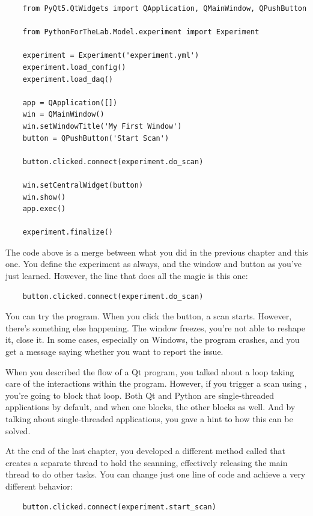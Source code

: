 \begin{verbatim}
    from PyQt5.QtWidgets import QApplication, QMainWindow, QPushButton

    from PythonForTheLab.Model.experiment import Experiment

    experiment = Experiment('experiment.yml')
    experiment.load_config()
    experiment.load_daq()

    app = QApplication([])
    win = QMainWindow()
    win.setWindowTitle('My First Window')
    button = QPushButton('Start Scan')

    button.clicked.connect(experiment.do_scan)

    win.setCentralWidget(button)
    win.show()
    app.exec()

    experiment.finalize()
\end{verbatim}

The code above is a merge between what you did in the previous chapter and this one. You define the experiment as always, and the window and button as you've just learned. However, the line that does all the magic is this one:

\begin{verbatim}
    button.clicked.connect(experiment.do_scan)
\end{verbatim}

You can try the program. When you click the button, a scan starts. However, there's something else happening. The window freezes, you're not able to reshape it, close it. In some cases, especially on Windows, the program crashes, and you get a message saying whether you want to report the issue.


When you described the flow of a Qt program, you talked about a loop taking care of the interactions within the program. However, if you trigger a scan using , you're going to block that loop. Both Qt and Python are single-threaded applications by default, and when one blocks, the other blocks as well. And by talking about single-threaded applications, you gave a hint to how this can be solved.

At the end of the last chapter, you developed a different method called  that creates a separate thread to hold the scanning, effectively releasing the main thread to do other tasks. You can change just one line of code and achieve a very different behavior:

\begin{verbatim}
    button.clicked.connect(experiment.start_scan)
\end{verbatim}

